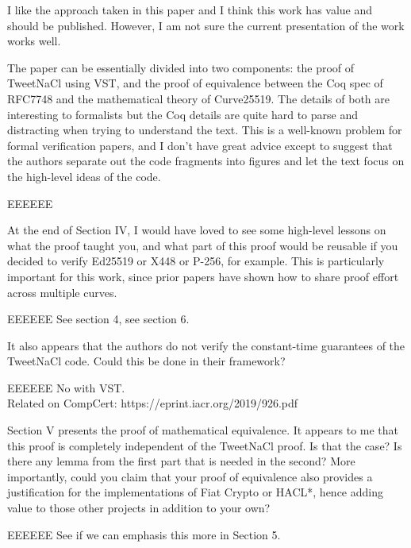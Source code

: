 I like the approach taken in this paper and I think this work has value and
should be published.
However, I am not sure the current presentation of the work works well.

The paper can be essentially divided into two components: the proof of TweetNaCl
using VST, and the proof of equivalence between the Coq spec of RFC7748 and the
mathematical theory of Curve25519.  The details of both are interesting to
formalists but the Coq details are quite hard to parse and distracting when
trying to understand the text. This is a well-known problem for formal
verification papers, and I don't have great advice except to suggest that the
authors separate out the code fragments into figures and let the text focus
on the high-level ideas of the code.

\begin{answer}{EEEEEE}
\end{answer}

At the end of Section IV, I would have loved to see some high-level lessons on
what the proof taught you, and what part of this proof would be reusable if you
decided to verify Ed25519 or X448 or P-256, for example. This is particularly
important for this work, since prior papers have shown how to share proof effort
across multiple curves.

\begin{answer}{EEEEEE}
See section 4, see section 6.
\end{answer}

It also appears that the authors do not verify the constant-time guarantees of
the TweetNaCl code. Could this be done in their framework?

\begin{answer}{EEEEEE}
No with VST.\\
Related on CompCert: https://eprint.iacr.org/2019/926.pdf
\end{answer}

Section V presents the proof of mathematical equivalence. It appears to me that
this proof is completely independent of the TweetNaCl proof. Is that the case?
Is there any lemma from the first part that is needed in the second? More
importantly, could you claim that your proof of equivalence also provides a
justification for the implementations of Fiat Crypto or HACL*, hence adding
value to those other projects in addition to your own?

\begin{answer}{EEEEEE}
See if we can emphasis this more in Section 5.
\end{answer}

